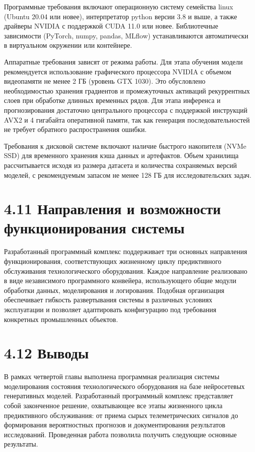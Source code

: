 \documentclass[14pt, a4paper, oneside]{extreport}
\begin{document}
Программные требования включают операционную систему семейства linux (Ubuntu 20.04 или новее), интерпретатор python версии 3.8 и выше, а также драйверы NVIDIA с поддержкой CUDA 11.0 или новее. Библиотечные зависимости (PyTorch, numpy, pandas, MLflow) устанавливаются автоматически в виртуальном окружении или контейнере.

Аппаратные требования зависят от режима работы. Для этапа обучения модели рекомендуется использование графического процессора NVIDIA с объемом видеопамяти не менее 2 ГБ (уровень GTX 1030). Это обусловлено необходимостью хранения градиентов и промежуточных активаций рекуррентных слоев при обработке длинных временных рядов. Для этапа инференса и прогнозирования достаточно центрального процессора с поддержкой инструкций AVX2 и 4 гигабайта оперативной памяти, так как генерация последовательностей не требует обратного распространения ошибки.

Требования к дисковой системе включают наличие быстрого накопителя (NVMe SSD) для временного хранения кэша данных и артефактов. Объем хранилища рассчитывается исходя из размера датасета и количества сохраняемых версий моделей, с рекомендуемым запасом не менее 128 ГБ для исследовательских задач.

\vspace{1em}
\section{4.11 Направления и возможности функционирования системы}
\vspace{1em}
Разработанный программный комплекс поддерживает три основных направления функционирования, соответствующих жизненному циклу предиктивного обслуживания технологического оборудования. Каждое направление реализовано в виде независимого программного конвейера, использующего общие модули обработки данных, моделирования и логирования. Подобная организация обеспечивает гибкость развертывания системы в различных условиях эксплуатации и позволяет адаптировать конфигурацию под требования конкретных промышленных объектов.


\vspace{1em}
\section{4.12 Выводы}
\vspace{1em}

В рамках четвертой главы выполнена программная реализация системы моделирования состояния технологического оборудования на базе нейросетевых генеративных моделей. Разработанный программный комплекс представляет собой законченное решение, охватывающее все этапы жизненного цикла предиктивного обслуживания: от приема сырых телеметрических сигналов до формирования вероятностных прогнозов и документирования результатов исследований. Проведенная работа позволила получить следующие основные результаты.
\end{document}
